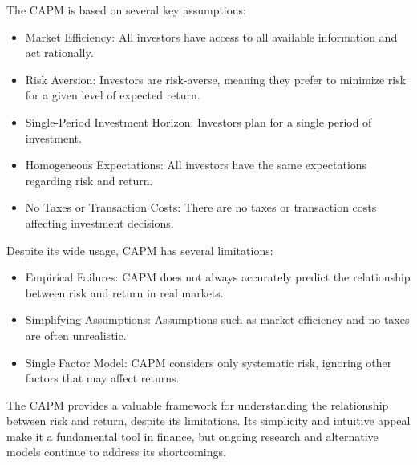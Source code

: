 The CAPM is based on several key assumptions:
\begin{itemize}
    \item Market Efficiency: All investors have access to all available information and act rationally.
    \item Risk Aversion: Investors are risk-averse, meaning they prefer to minimize risk for a given level of expected return.
    \item Single-Period Investment Horizon: Investors plan for a single period of investment.
    \item Homogeneous Expectations: All investors have the same expectations regarding risk and return.
    \item No Taxes or Transaction Costs: There are no taxes or transaction costs affecting investment decisions.
\end{itemize}


Despite its wide usage, CAPM has several limitations:
\begin{itemize}
    \item Empirical Failures: CAPM does not always accurately predict the relationship between risk and return in real markets.
    \item Simplifying Assumptions: Assumptions such as market efficiency and no taxes are often unrealistic.
    \item Single Factor Model: CAPM considers only systematic risk, ignoring other factors that may affect returns.
\end{itemize}

The CAPM provides a valuable framework for understanding the relationship between risk and return, despite its limitations. Its simplicity and intuitive appeal make it a fundamental tool in finance, but ongoing research and alternative models continue to address its shortcomings.





